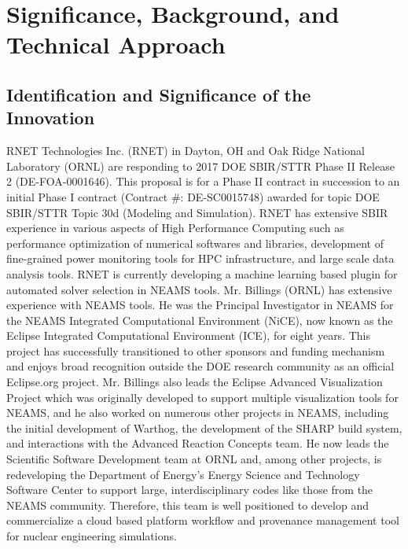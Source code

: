 \section{Significance, Background, and Technical Approach}

\subsection{Identification and Significance of the Innovation}
\label{sec:identification}

RNET Technologies Inc. (RNET) in Dayton, OH and Oak Ridge National Laboratory 
(ORNL) are responding to 2017 DOE SBIR/STTR Phase II Release 2 
(DE-FOA-0001646). This proposal is for a Phase II contract in succession to an 
initial Phase I contract (Contract \#: DE-SC0015748) awarded for topic DOE 
SBIR/STTR Topic 30d (Modeling and Simulation). RNET has extensive SBIR 
experience in various aspects of High Performance Computing such as performance 
optimization of numerical softwares and libraries, development of fine-grained 
power monitoring tools for HPC infrastructure, and large scale data analysis 
tools. RNET is currently developing a machine learning based plugin for 
automated solver selection in NEAMS tools. Mr. Billings (ORNL) has extensive 
experience with NEAMS tools. He was the Principal Investigator in NEAMS for the NEAMS
Integrated Computational Environment (NiCE), now known as the Eclipse Integrated Computational Environment (ICE), for eight years. This project has successfully transitioned to other sponsors and funding mechanism and enjoys broad recognition outside the DOE research community as an official Eclipse.org project. Mr. Billings also leads the Eclipse Advanced Visualization Project which was originally developed to support multiple visualization tools for NEAMS, and he also worked on numerous other projects in NEAMS, including the initial development of Warthog, the development of the SHARP build system, and interactions with the Advanced Reaction Concepts team. He now leads the Scientific Software Development team at ORNL and, among other projects, is redeveloping the Department of Energy's Energy Science and Technology Software Center to support large, interdisciplinary codes like those from the NEAMS community. Therefore, this team is well positioned to develop and 
commercialize a cloud based platform workflow and provenance management tool for nuclear engineering simulations. 

